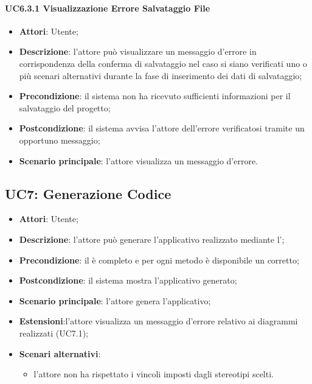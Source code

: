 \paragraph{UC6.3.1 Visualizzazione Errore Salvataggio File}
\begin{itemize}
\item \textbf{Attori}: Utente;
\item \textbf{Descrizione}: l'attore può visualizzare un messaggio d'errore in corrispondenza della conferma di salvataggio nel caso si siano verificati uno o più scenari alternativi durante la fase di inserimento dei dati di salvataggio;	
\item \textbf{Precondizione}: il sistema non ha ricevuto sufficienti informazioni per il salvataggio del progetto;	
\item \textbf{Postcondizione}: il sistema avvisa l'attore dell'errore verificatosi tramite un opportuno messaggio;	
\item \textbf{Scenario principale}:
l'attore visualizza un messaggio d'errore.	
\end{itemize}

\subsection{UC7: Generazione Codice}
\label{UC7}
\begin{itemize}
\item \textbf{Attori}: Utente;
\item \textbf{Descrizione}: l'attore può generare l'applicativo realizzato mediante l';
\item \textbf{Precondizione}: il  è completo e per ogni metodo è disponibile un  corretto;
\item \textbf{Postcondizione}: il sistema mostra l'applicativo generato;
\item \textbf{Scenario principale}:
l'attore genera l'applicativo;
\item \textbf{Estensioni}:l'attore visualizza un messaggio d'errore relativo ai diagrammi realizzati (UC7.1);
\item \textbf{Scenari alternativi}:
\begin{itemize}
\item l'attore non ha rispettato i vincoli imposti dagli stereotipi scelti.
\end{itemize}
\end{itemize}

